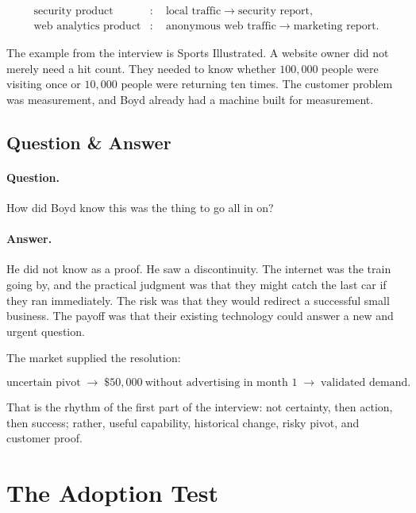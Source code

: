 \begin{align}
\text{security product}
&:\quad
\text{local traffic} \longrightarrow \text{security report},\\
\text{web analytics product}
&:\quad
\text{anonymous web traffic} \longrightarrow \text{marketing report}.
\end{align}

The example from the interview is Sports Illustrated. A website owner did not merely need a hit count. They needed to know whether \(100{,}000\) people were visiting once or \(10{,}000\) people were returning ten times. The customer problem was measurement, and Boyd already had a machine built for measurement.

\subsection{Question \& Answer}

\paragraph{Question.}
How did Boyd know this was the thing to go all in on?

\paragraph{Answer.}
He did not know as a proof. He saw a discontinuity. The internet was the train going by, and the practical judgment was that they might catch the last car if they ran immediately. The risk was that they would redirect a successful small business. The payoff was that their existing technology could answer a new and urgent question.

The market supplied the resolution:

\begin{equation}
\text{uncertain pivot}
\;\longrightarrow\;
\$50{,}000\ \text{without advertising in month 1}
\;\longrightarrow\;
\text{validated demand}.
\end{equation}

That is the rhythm of the first part of the interview: not certainty, then action, then success; rather, useful capability, historical change, risky pivot, and customer proof.

\section{The Adoption Test}

